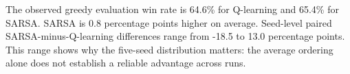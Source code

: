 The observed greedy evaluation win rate is 64.6\% for Q-learning and 65.4\% for SARSA. SARSA is 0.8 percentage points higher on average. Seed-level paired SARSA-minus-Q-learning differences range from -18.5 to 13.0 percentage points. This range shows why the five-seed distribution matters: the average ordering alone does not establish a reliable advantage across runs.\par
